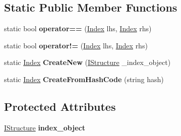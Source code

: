 \subsection*{Static Public Member Functions}
\begin{DoxyCompactItemize}
\item 
\hypertarget{class_dwarf_d_b_1_1_data_structures_1_1_index_aa332f812fd66a7516a1749a6c29a04c6}{static bool {\bfseries operator==} (\hyperlink{class_dwarf_d_b_1_1_data_structures_1_1_index}{Index} lhs, \hyperlink{class_dwarf_d_b_1_1_data_structures_1_1_index}{Index} rhs)}\label{class_dwarf_d_b_1_1_data_structures_1_1_index_aa332f812fd66a7516a1749a6c29a04c6}

\item 
\hypertarget{class_dwarf_d_b_1_1_data_structures_1_1_index_a58d657c3d8d9fd9d122d59bf55008495}{static bool {\bfseries operator!=} (\hyperlink{class_dwarf_d_b_1_1_data_structures_1_1_index}{Index} lhs, \hyperlink{class_dwarf_d_b_1_1_data_structures_1_1_index}{Index} rhs)}\label{class_dwarf_d_b_1_1_data_structures_1_1_index_a58d657c3d8d9fd9d122d59bf55008495}

\item 
\hypertarget{class_dwarf_d_b_1_1_data_structures_1_1_index_a8e14d93c580e2aadd133afeef416e44a}{static \hyperlink{class_dwarf_d_b_1_1_data_structures_1_1_index}{Index} {\bfseries Create\+New} (\hyperlink{interface_dwarf_d_b_1_1_data_structures_1_1_i_structure}{I\+Structure} \+\_\+index\+\_\+object)}\label{class_dwarf_d_b_1_1_data_structures_1_1_index_a8e14d93c580e2aadd133afeef416e44a}

\item 
\hypertarget{class_dwarf_d_b_1_1_data_structures_1_1_index_affa4776e5dd06a160e8a874b0f64d769}{static \hyperlink{class_dwarf_d_b_1_1_data_structures_1_1_index}{Index} {\bfseries Create\+From\+Hash\+Code} (string hash)}\label{class_dwarf_d_b_1_1_data_structures_1_1_index_affa4776e5dd06a160e8a874b0f64d769}

\end{DoxyCompactItemize}
\subsection*{Protected Attributes}
\begin{DoxyCompactItemize}
\item 
\hypertarget{class_dwarf_d_b_1_1_data_structures_1_1_index_a028b92bd2f8012fe81b60d0fbac93044}{\hyperlink{interface_dwarf_d_b_1_1_data_structures_1_1_i_structure}{I\+Structure} {\bfseries index\+\_\+object}}\label{class_dwarf_d_b_1_1_data_structures_1_1_index_a028b92bd2f8012fe81b60d0fbac93044}

\end{DoxyCompactItemize}
